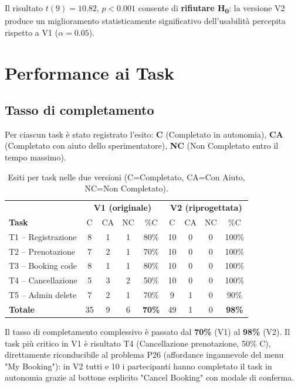 Il risultato $t(9) = 10.82$, $p < 0.001$ consente di \textbf{rifiutare H\textsubscript{0}}: la versione V2 produce un miglioramento statisticamente significativo dell'usabilità percepita rispetto a V1 ($\alpha = 0.05$).

\section{Performance ai Task}

\subsection{Tasso di completamento}

Per ciascun task è stato registrato l'esito: \textbf{C} (Completato in autonomia), \textbf{CA} (Completato con aiuto dello sperimentatore), \textbf{NC} (Non Completato entro il tempo massimo).

\begin{table}[H]
\centering
\renewcommand{\arraystretch}{1.4}
\small
\begin{tabular}{|l|ccc|c|ccc|c|}
\hline
 & \multicolumn{4}{c|}{\textbf{V1 (originale)}} & \multicolumn{4}{c|}{\textbf{V2 (riprogettata)}} \\
\textbf{Task} & C & CA & NC & \%C & C & CA & NC & \%C \\
\hline
T1 -- Registrazione  & 8 & 1 & 1 & 80\% & 10 & 0 & 0 & 100\% \\ \hline
T2 -- Prenotazione   & 7 & 2 & 1 & 70\% & 10 & 0 & 0 & 100\% \\ \hline
T3 -- Booking code   & 8 & 1 & 1 & 80\% & 10 & 0 & 0 & 100\% \\ \hline
T4 -- Cancellazione  & 5 & 3 & 2 & 50\% & 10 & 0 & 0 & 100\% \\ \hline
T5 -- Admin delete   & 7 & 2 & 1 & 70\% &  9 & 1 & 0 &  90\% \\ \hline
\hline
\textbf{Totale}      & 35 & 9 & 6 & \textbf{70\%} & 49 & 1 & 0 & \textbf{98\%} \\ \hline
\end{tabular}
\caption{Esiti per task nelle due versioni (C=Completato, CA=Con Aiuto, NC=Non Completato).}
\label{tab:completion}
\end{table}

Il tasso di completamento complessivo è passato dal \textbf{70\%} (V1) al \textbf{98\%} (V2). Il task più critico in V1 è risultato T4 (Cancellazione prenotazione, 50\% C), direttamente riconducibile al problema P26 (affordance ingannevole del menu "My Booking"): in V2 tutti e 10 i partecipanti hanno completato il task in autonomia grazie al bottone esplicito "Cancel Booking" con modale di conferma.

